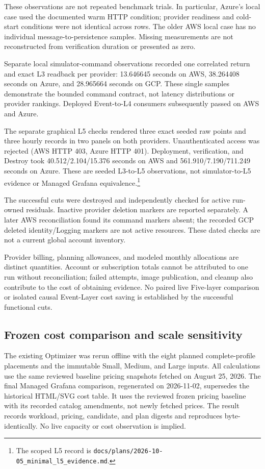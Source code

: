 These observations are not repeated benchmark trials. In particular, Azure's
local case used the documented warm HTTP condition; provider readiness and
cold-start conditions were not identical across rows. The older AWS local case
has no individual message-to-persistence samples. Missing measurements are not
reconstructed from verification duration or presented as zero.

Separate local simulator-command observations recorded one correlated return
and exact L3 readback per provider: 13.646645 seconds on AWS, 38.264408 seconds
on Azure, and 28.965664 seconds on GCP. These single samples demonstrate the
bounded command contract, not latency distributions or provider rankings.
Deployed Event-to-L4 consumers subsequently passed on AWS and Azure.

The separate graphical L5 checks rendered three exact seeded raw points and
three hourly records in two panels on both providers. Unauthenticated access
was rejected (AWS HTTP 403, Azure HTTP 401). Deployment, verification, and
Destroy took 40.512/2.104/15.376 seconds on AWS and
561.910/7.190/711.249 seconds on Azure. These are seeded L3-to-L5 observations,
not simulator-to-L5 evidence or Managed Grafana equivalence.\footnote{The
scoped L5 record is \texttt{docs/plans/2026-10-05\_minimal\_l5\_evidence.md}.}

The successful cuts were destroyed and independently checked for active
run-owned residuals. Inactive provider deletion markers are reported separately.
A later AWS reconciliation found its command markers absent; the recorded GCP
deleted identity/Logging markers are not active resources. These dated checks
are not a current global account inventory.

Provider billing, planning allowances, and modeled monthly allocations are
distinct quantities. Account or subscription totals cannot be attributed to
one run without reconciliation; failed attempts, image publication, and cleanup
also contribute to the cost of obtaining evidence. No paired live Five-layer
comparison or isolated causal Event-Layer cost saving is established by the
successful functional cuts.

\subsection{Frozen cost comparison and scale sensitivity}
The existing Optimizer was rerun offline with the eight planned complete-profile
placements and the immutable Small, Medium, and Large inputs. All calculations
use the same reviewed baseline pricing snapshots fetched on August 25, 2026.
The final Managed Grafana comparison, regenerated on 2026-11-02, supersedes
the historical HTML/SVG cost table. It uses the reviewed frozen pricing
baseline with its recorded catalog amendments, not newly fetched prices.
The result records workload, pricing, candidate, and plan digests and reproduces
byte-identically. No live capacity or cost observation is implied.

